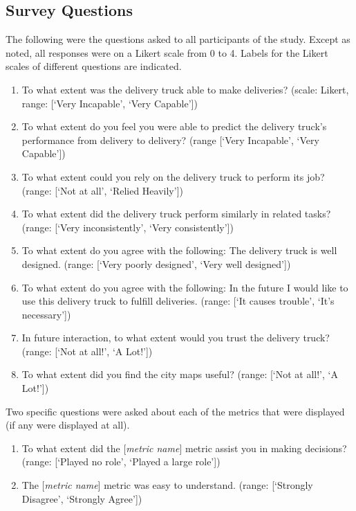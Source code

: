 \subsection{Survey Questions}
The following were the questions asked to all participants of the study. Except as noted, all responses were on a Likert scale from 0 to 4. Labels for the Likert scales of different questions are indicated.


\begin{quoting}
\begin{enumerate}[label=\textbf{Survey~\arabic*)}]
    \item To what extent was the delivery truck able to make deliveries? (scale: Likert, range: [`Very Incapable', `Very Capable'])
    \item To what extent do you feel you were able to predict the delivery truck's performance from delivery to delivery? (range [`Very Incapable', `Very Capable'])
    \item To what extent could you rely on the delivery truck to perform its job? (range: [`Not at all', `Relied Heavily'])
    \item To what extent did the delivery truck perform similarly in related tasks? (range: [`Very inconsistently', `Very consistently'])
    \item To what extent do you agree with the following: The delivery truck is well designed. (range: [`Very poorly designed', `Very well designed'])
    \item To what extent do you agree with the following: In the future I would like to use this delivery truck to fulfill deliveries. (range: [`It causes trouble', `It's necessary'])
    \item In future interaction, to what extent would you trust the delivery truck? (range: [`Not at all!', `A Lot!'])
    \item To what extent did you find the city maps useful? (range: [`Not at all!', `A Lot!'])
\end{enumerate}
\end{quoting}

Two specific questions were asked about each of the \famsec{} metrics that were displayed (if any were displayed at all).
\begin{quoting}
\begin{enumerate}[label=\textbf{\famsec~\arabic*)}]
    \item To what extent did the [\emph{metric name}] metric assist you in making decisions? (range: [`Played no role', `Played a large role']) 
    \item The [\emph{metric name}] metric was easy to understand. (range: [`Strongly Disagree', `Strongly Agree']) 
\end{enumerate}
\end{quoting}


